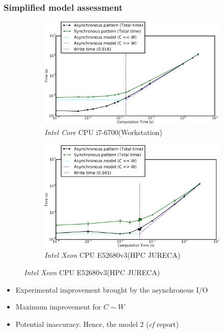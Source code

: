 \documentclass[slidestop,xcolor=dvipsnames, notes=hide]{beamer}
\newcommand{\targetPlatformHpc}				{\targetPlatformHpcProcessor\space (HPC JURECA)}
\newcommand{\targetPlatformHpcProcessor}	{\emph{Intel Xeon} CPU E52680v3}
\newcommand{\targetPlatformLaptop}			{\targetPlatformProcessor\space (Workstation)}
\newcommand{\targetPlatformProcessor}		{\emph{Intel Core} CPU i7-6700}
\newcommand{\notationIO}					{I/O}
\newcommand{\notationaio}					{asynchronous \notationIO}
\begin{document}
		\begin{frame}
			\frametitle{Simplified model assessment}
			\center
			\begin{figure}[!h]
				\centering
				\begin{subfigure}[b]{0.48\textwidth}
					\centering
					\includegraphics[width=\textwidth]{images/model0_workstation_8core_logScale.png}
					\caption[]%
					{{\small \targetPlatformLaptop}}
				\end{subfigure}
				\hfill
				\begin{subfigure}[b]{0.475\textwidth}  
					\centering 
					\includegraphics[width=\textwidth]{images/model0_hpc_2Proc_1IoDevice_logScale.png}
					\caption[]%
					{{\small \targetPlatformHpc}}
				\end{subfigure}
			\end{figure}

			\begin{block}{}
			\begin{itemize}
				\item Experimental improvement brought by the \notationaio
				\item Maximum improvement for $C \sim W$
				\pause
				\item Potential inaccuracy.   Hence, the model 2 (\emph{cf} report)
			\end{itemize}
			\end{block}
		\end{frame}
\end{document}
